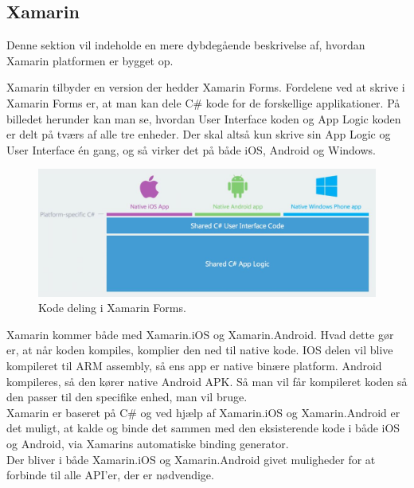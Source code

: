 \subsection{Xamarin}
Denne sektion vil indeholde en mere dybdegående beskrivelse af, hvordan Xamarin platformen er bygget op.

Xamarin tilbyder en version der hedder Xamarin Forms\cite{Forms}. Fordelene ved at skrive i Xamarin Forms er, at man kan dele C\# kode for de forskellige applikationer.
På billedet herunder kan man se, hvordan User Interface koden og App Logic koden er delt på tværs af alle tre enheder. Der skal altså kun skrive sin App Logic og User Interface én gang, og så virker det på både iOS, Android og Windows.
\begin{figure}[H]
	\centering
	\includegraphics[width=1\linewidth]{Applikation/XarmarinShare.JPG}
	\caption{Kode deling i Xamarin Forms.\cite{Xarmain}}
	\label{fig:CodeShare}
\end{figure}

\clearpage

Xamarin kommer både med Xamarin.iOS og Xamarin.Android. Hvad dette gør er, at når koden kompiles, komplier den ned til native kode. IOS delen vil blive kompileret til ARM assembly, så ens app er native binære platform. Android kompileres, så den kører native Android APK. Så man vil får kompileret koden så den passer til den specifike enhed, man vil bruge. \\
Xamarin er baseret på C\# og ved hjælp af Xamarin.iOS og Xamarin.Android er det muligt, at kalde og binde det sammen med den eksisterende kode i både iOS og Android, via Xamarins automatiske binding generator. \\
Der bliver i både Xamarin.iOS og Xamarin.Android givet muligheder for at forbinde til alle API'er, der er nødvendige. \\

